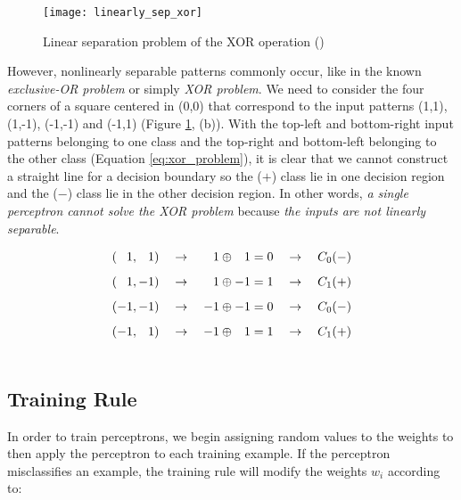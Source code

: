 	\begin{figure}[!ht]
		\centering
		\texttt{[image: linearly\_sep\_xor]}
		\caption{Linear separation problem of the XOR operation (\cite{mitchell1997})}
		\label{fig:linear_sep_xor}
	\end{figure}

	However, nonlinearly separable patterns commonly occur, like in the known \textit{exclusive-OR problem} or simply \textit{XOR problem}. We need to consider the four corners of a square centered in (0,0) that correspond to the input patterns (1,1), (1,-1), (-1,-1) and (-1,1) (Figure \ref{fig:linear_sep_xor}, (b)). With the top-left and bottom-right input patterns belonging to one class and the top-right and bottom-left belonging to the other class (Equation \ref{eq:xor_problem}), it is clear that we cannot construct a straight line for a decision boundary so the ($+$) class lie in one decision region and the ($-$) class lie in the other decision region. In other words, \textit{a single perceptron cannot solve the XOR problem} because \textit{the inputs are not linearly separable}.

	\begin{equation}
		\label{eq:xor_problem}
	    \begin{aligned}
	        (\hspace{0.78em} 1,\hspace{0.78em} 1) \quad \rightarrow \quad  \hspace{0.78em} 1 \oplus \hspace{0.78em} 1 = 0 \quad \rightarrow \quad C_0(-) \\[5pt]
	        (\hspace{0.78em} 1,-1) \quad \rightarrow \quad  \hspace{0.78em} 1 \oplus -1 = 1 \quad \rightarrow \quad C_1(+) \\[5pt]
	        (-1,-1) \quad \rightarrow \quad -1 \oplus -1 = 0 \quad \rightarrow \quad C_0(-) \\[5pt]
	        (-1, \hspace{0.78em} 1) \quad \rightarrow \quad -1 \oplus \hspace{0.78em} 1 = 1 \quad \rightarrow \quad C_1(+) \\[15pt]
	    \end{aligned}
	\end{equation}

	\subsection{Training Rule}
	In order to train perceptrons, we begin assigning random values to the weights to then apply the perceptron to each training example. If the perceptron misclassifies an example, the training rule will modify the weights $w_i$ according to:

